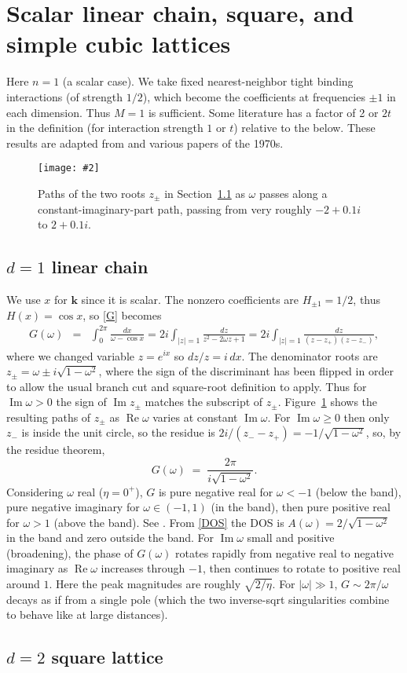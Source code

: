 \documentclass[11pt]{article}
\newcommand{\bea}{\begin{eqnarray}}
\newcommand{\eea}{\end{eqnarray}}
\newcommand{\bfi}{\begin{figure}}
\newcommand{\efi}{\end{figure}}
\newcommand{\ca}[2]{\caption{#1 \label{#2}}}
\newcommand{\ig}[2]{\texttt{[image: \#2]}}
\newcommand{\mbf}[1]{{\mathbf #1}}
\DeclareMathOperator{\re}{Re}
\DeclareMathOperator{\im}{Im}
\newcommand{\om}{\omega}
\newcommand{\kk}{\mbf{k}}
\begin{document}
\section{Scalar linear chain, square, and simple cubic lattices}

Here $n=1$ (a scalar case). We take fixed
nearest-neighbor tight binding interactions (of strength $1/2$), which become
the coefficients at frequencies $\pm 1$ in each dimension.
Thus $M=1$ is sufficient.
Some literature has
a factor of 2 or $2t$ in the definition (for interaction strength $1$ or $t$) relative to the below.
These results are adapted from \cite[Ch.~5]{economou}
and various papers of the 1970s.


\bfi %
\centering
\ig{width=3.5in}{zpaths}    %
\ca{Paths of the two roots $z_\pm$ in Section~\ref{s:1d} as
  $\om$ passes along a constant-imaginary-part
  path, passing from very roughly $-2+0.1i$ to $2+0.1i$.}{f:zpaths}
\efi

\subsection{$d=1$ linear chain}
\label{s:1d}

We use $x$ for $\kk$ since it is scalar.
The nonzero coefficients are $H_{\pm 1} = 1/2$,
thus $H(x) = \cos x$,
so \eqref{G} becomes
\bea
G(\om) &=& \int_0^{2\pi} \frac{dx}{\om - \cos x}
= 2i \int_{|z|=1} \frac{dz}{z^2-2\om z + 1}
= 2i \int_{|z|=1} \frac{dz}{(z-z_+)(z-z_-)},
\nonumber
\eea
where we changed variable $z = e^{ix}$ so $dz/z = i\,dx$.
The denominator roots are $z_\pm = \om\pm i\sqrt{1-\om^2}$, where
the sign of the discriminant has been flipped in order to allow
the usual branch cut and square-root definition to apply.
Thus for $\im \om > 0$ the sign of $\im z_\pm$
matches the subscript of $z_\pm$.
Figure~\ref{f:zpaths} shows the resulting paths of $z_\pm$ as $\re \om$
varies at constant $\im \om$.
For $\im \om \ge 0$ then only $z_-$ is inside the unit circle, so
the residue is $2i/(z_--z_+) = -1/\sqrt{1-\om^2}$, so, by
the residue theorem,
\[
G(\om) \;=\; \frac{2\pi}{i \sqrt{1-\om^2}}.
\]
Considering $\om$ real ($\eta=0^+$),
$G$ is pure negative real for $\om<-1$ (below the band),
pure negative imaginary for $\om \in (-1,1)$ (in the band),
then pure positive real for $\om>1$ (above the band).
See \cite[Fig.~5.6]{economou}.
From \eqref{DOS} the DOS is $A(\om) = 2/\sqrt{1-\om^2}$ in the band and zero
outside the band.
For $\im \om$ small and positive (broadening),
the phase of $G(\om)$ rotates rapidly from negative real to negative imaginary as
$\re\om$ increases through $-1$, then continues to rotate to positive real
around $1$.
Here the peak magnitudes are roughly $\sqrt{2/\eta}$.
For $|\om|\gg 1$, $G \sim 2\pi/\om$ decays as if from
a single pole (which the two inverse-sqrt singularities combine to
behave like at large distances).


\subsection{$d=2$ square lattice}
\label{s:2d}







\end{document}
